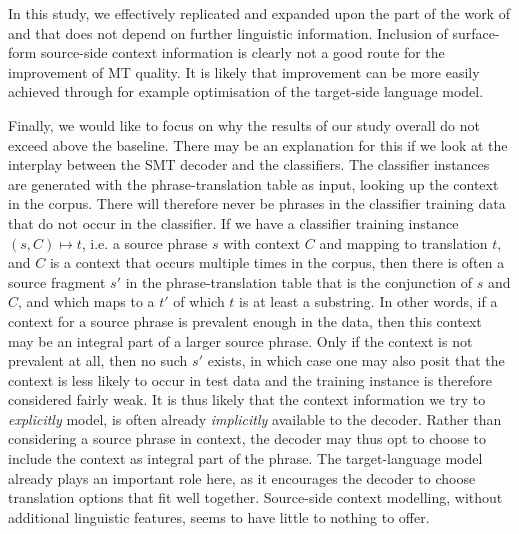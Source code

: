 In this study, we effectively replicated and expanded upon the part of the work
of \cite{Stroppa+07} and \cite{Rejwanul+11} that does not depend on further
linguistic information. Inclusion of surface-form source-side context
information is clearly not a good route for the improvement of MT
quality. It is likely that improvement can be more easily achieved through for
example optimisation of the target-side language model.

Finally, we would like to focus on why the results of our study
overall do not exceed above the baseline.  There may be an explanation for this
if we look at the interplay between the SMT decoder and the classifiers. The
classifier instances are generated with the phrase-translation table as input,
looking up the context in the corpus. There will therefore never be phrases in
the classifier training data that do not occur in the classifier. If we have a
classifier training instance $(s,C) \mapsto t$, i.e.  a source phrase $s$ with
context $C$ and mapping to translation $t$, and $C$ is a context that occurs
multiple times in the corpus, then there is often a source fragment $s'$ in the
phrase-translation table that is the conjunction of $s$ and $C$, and which maps
to a $t'$ of which $t$ is at least a substring. In other words, if a context
for a source phrase is prevalent enough in the data, then this context may be
an integral part of a larger source phrase. Only if the context is not
prevalent at all, then no such $s'$ exists, in which case one may also posit
that the context is less likely to occur in test data and the training instance
is therefore considered fairly weak.  It is thus likely that the context
information we try to \emph{explicitly} model, is often already
\emph{implicitly} available to the decoder.  Rather than considering a source
phrase in context, the decoder may thus opt to choose to include the context as
integral part of the phrase.  The target-language model already plays an
important role here, as it encourages the decoder to choose translation options
that fit well together. Source-side context modelling, without additional
linguistic features, seems to have little to nothing to offer.


